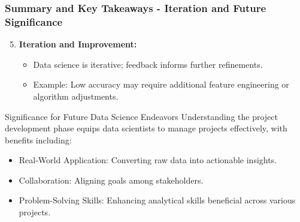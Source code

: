 \documentclass[aspectratio=169]{beamer}
\begin{document}
\begin{frame}[fragile]
    \frametitle{Summary and Key Takeaways - Iteration and Future Significance}
    \begin{enumerate}
        \setcounter{enumi}{4} %
        \item \textbf{Iteration and Improvement:}
            \begin{itemize}
                \item Data science is iterative; feedback informs further refinements.
                \item Example: Low accuracy may require additional feature engineering or algorithm adjustments.
            \end{itemize}
    \end{enumerate}

    \begin{block}{Significance for Future Data Science Endeavors}
        Understanding the project development phase equips data scientists to manage projects effectively, with benefits including:
        \begin{itemize}
            \item Real-World Application: Converting raw data into actionable insights.
            \item Collaboration: Aligning goals among stakeholders.
            \item Problem-Solving Skills: Enhancing analytical skills beneficial across various projects.
        \end{itemize}
    \end{block}
\end{frame}
\end{document}
